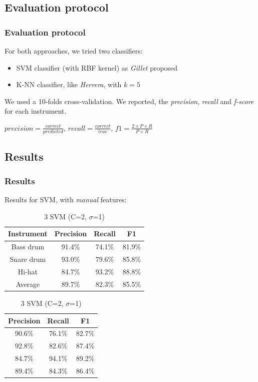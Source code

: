 \documentclass{beamer}
\begin{document}
    \subsection{Evaluation protocol}
    \begin{frame}
        \frametitle{Evaluation protocol}
        For both approaches, we tried two classifiers:
        \begin{itemize}
            \item SVM classifier (with RBF kernel) as \emph{Gillet} proposed
            \item K-NN classifier, like \emph{Herrera}, with $k=5$
        \end{itemize}
      
        We used a 10-folds cross-validation.
        We reported, the \emph{precision}, \emph{recall} and \emph{f-score} for each instrument.
        \vspace{0.5cm}
        
        $precision=\frac{correct}{predicted}$,
        $recall=\frac{correct}{true}$,
        $f1=\frac{2\times P\times R}{P+R}$
    \end{frame}
    \subsection{Results}
    \begin{frame}
        \frametitle{Results}
        Results for SVM, with \emph{manual} features:
        \begin{center}
        \footnotesize 
        \begin{table}
        \parbox{.50\linewidth}{       
        \caption{SVM (C=2, $\sigma$=1)}
        \begin{tabular}{|c|c|c|c|}
        \hline
        Instrument&Precision&Recall&F1\\
        \hline
        Bass drum&91.4\%&74.1\%&81.9\%\\
        \hline
        Snare drum&93.0\%&79.6\%&85.8\%\\
        \hline
        Hi-hat&84.7\%&93.2\%&88.8\%\\
        \hline
        Average&89.7\%&82.3\%&85.5\%\\
        \hline
        \end{tabular}
        }
        \hfill
        \parbox{.40\linewidth}{
        \caption{3 SVM (C=2, $\sigma$=1)}
        \begin{tabular}{|c|c|c|}
        \hline
        Precision&Recall&F1\\
        \hline
        90.6\%&76.1\%&82.7\%\\
        \hline
        92.8\%&82.6\%&87.4\%\\
        \hline
        84.7\%&94.1\%&89.2\%\\
        \hline
        89.4\%&84.3\%&86.4\%\\
        \hline
        \end{tabular}
        }
        \end{table}

        \end{center}
    \end{frame}
    
\end{document}

